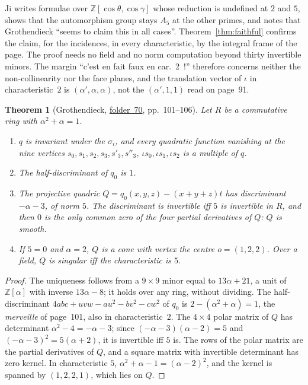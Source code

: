 \documentclass[11pt,a4paper]{amsart}
\newtheorem{theorem}{Theorem}[section]
\theoremstyle{definition}
\theoremstyle{remark}
\newcommand{\Z}{\mathbb Z}
\newcommand{\fac}[1]{\href{https://grothendieck.umontpellier.fr/#1.pdf}{folder~#1}}
\begin{document}
Ji \cite{ji2023} writes formulae over $\Z[\cos\theta, \cos\gamma]$ whose reduction is undefined at $2$ and $5$, shows that the automorphism group stays $A_5$ at the other primes, and notes that Grothendieck ``seems to claim this in all cases''. Theorem~\ref{thm:faithful} confirms the claim, for the incidences, in every characteristic, by the integral frame of the page. The proof needs no field and no norm computation beyond thirty invertible minors. The margin ``c'est en fait faux en car.~2~!'' therefore concerns neither the non-collinearity nor the face planes, and the translation vector of $\iota$ in characteristic~$2$ is $(\alpha', \alpha, \alpha)$, not the $(\alpha', 1, 1)$ read on page~91.

\begin{theorem}[Grothendieck, \fac{70}, pp.~101--106]\label{thm:quadric}
Let $R$ be a commutative ring with $\alpha^2 + \alpha = 1$.
\begin{enumerate}
\item $q$ is invariant under the $\sigma_i$, and every quadratic function vanishing at the nine vertices $s_0, s_1, s_2, s_3, s'_3, s''_3$, $\iota s_0, \iota s_1, \iota s_2$ is a multiple of $q$.
\item The half-discriminant of $q_0$ is $1$.
\item The projective quadric $Q = q_0(x,y,z) - (x+y+z)t$ has discriminant $-\alpha - 3$, of norm $5$. The discriminant is invertible iff $5$ is invertible in $R$, and then $0$ is the only common zero of the four partial derivatives of $Q$: $Q$ is smooth.
\item If $5 = 0$ and $\alpha = 2$, $Q$ is a cone with vertex the centre $o = (1, 2, 2)$. Over a field, $Q$ is singular iff the characteristic is $5$.
\end{enumerate}
\end{theorem}

\begin{proof}
The uniqueness follows from a $9 \times 9$ minor equal to $13\alpha + 21$, a unit of $\Z[\alpha]$ with inverse $13\alpha - 8$; it holds over any ring, without dividing. The half-discriminant $4abc + uvw - au^2 - bv^2 - cw^2$ of $q_0$ is $2 - (\alpha^2 + \alpha) = 1$, the \emph{merveille} of page~101, also in characteristic~$2$. The $4 \times 4$ polar matrix of $Q$ has determinant $\alpha^2 - 4 = -\alpha - 3$; since $(-\alpha - 3)(\alpha - 2) = 5$ and $(-\alpha - 3)^2 = 5(\alpha + 2)$, it is invertible iff $5$ is. The rows of the polar matrix are the partial derivatives of $Q$, and a square matrix with invertible determinant has zero kernel. In characteristic $5$, $\alpha^2 + \alpha - 1 = (\alpha - 2)^2$, and the kernel is spanned by $(1, 2, 2, 1)$, which lies on $Q$.
\end{proof}
\end{document}
